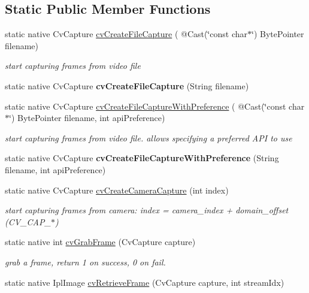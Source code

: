 \subsection*{Static Public Member Functions}
\begin{DoxyCompactItemize}
\item 
static native Cv\+Capture \hyperlink{group__videoio__c_gaf71dcb88fc0c7476076b298ed762ddca}{cv\+Create\+File\+Capture} ( @Cast(\char`\"{}const char$\ast$\char`\"{}) Byte\+Pointer filename)
\begin{DoxyCompactList}\small\item\em start capturing frames from video file \end{DoxyCompactList}\item 
static native Cv\+Capture {\bfseries cv\+Create\+File\+Capture} (String filename)
\item 
static native Cv\+Capture \hyperlink{group__videoio__c_ga11789f0474ae978b9ec17590706f9901}{cv\+Create\+File\+Capture\+With\+Preference} ( @Cast(\char`\"{}const char$\ast$\char`\"{}) Byte\+Pointer filename, int api\+Preference)
\begin{DoxyCompactList}\small\item\em start capturing frames from video file. allows specifying a preferred A\+PI to use \end{DoxyCompactList}\item 
static native Cv\+Capture {\bfseries cv\+Create\+File\+Capture\+With\+Preference} (String filename, int api\+Preference)
\item 
static native Cv\+Capture \hyperlink{group__videoio__c_ga43844b7ee876e73697163ae51ec617db}{cv\+Create\+Camera\+Capture} (int index)
\begin{DoxyCompactList}\small\item\em start capturing frames from camera\+: index = camera\+\_\+index + domain\+\_\+offset (C\+V\+\_\+\+C\+A\+P\+\_\+$\ast$) \end{DoxyCompactList}\item 
static native int \hyperlink{group__videoio__c_ga630e4d9ab3ff9f05ab4bc5ba1eb1d787}{cv\+Grab\+Frame} (Cv\+Capture capture)
\begin{DoxyCompactList}\small\item\em grab a frame, return 1 on success, 0 on fail. \end{DoxyCompactList}\item 
static native Ipl\+Image \hyperlink{group__videoio__c_ga0bb2a83d7a4cd242fae9561742b4af37}{cv\+Retrieve\+Frame} (Cv\+Capture capture, int stream\+Idx)

\end{DoxyCompactItemize}
